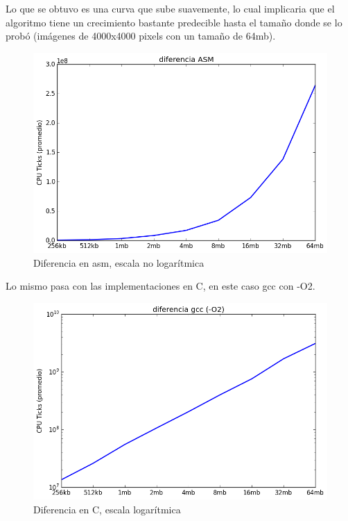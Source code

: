 \documentclass[a4paper]{article}
\begin{document}
 Lo que se obtuvo es una curva que sube suavemente, lo cual implicaria que el algoritmo tiene un crecimiento bastante predecible hasta el tamaño donde se lo probó (imágenes de 4000x4000 pixels con un tamaño de 64mb).

\begin{figure}[h]
	\centerline{\includegraphics[scale=0.60]{imagenes/test_performance_size_ASM_not_log.png}}
	\caption{Diferencia en asm, escala no logarítmica}
\end{figure}

\newpage 

Lo mismo pasa con las implementaciones en C, en este caso gcc con -O2.

\begin{figure}[h]
	\centerline{\includegraphics[scale=0.60]{imagenes/test_performance_size_C.png}}
	\caption{Diferencia en C, escala logarítmica}
\end{figure}
\end{document}
